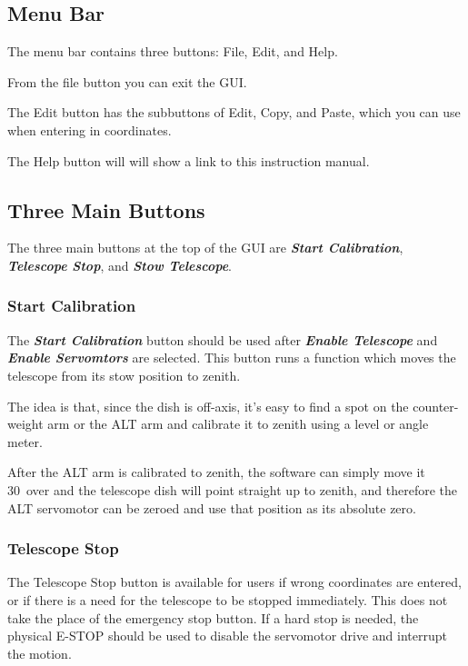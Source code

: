 \documentclass{article}
\begin{document}
\subsection{Menu Bar}

The menu bar contains three buttons: File, Edit, and Help.

From the file button you can exit the GUI.

The Edit button has the subbuttons of Edit, Copy, and Paste, which you can use when entering in coordinates.

The Help button will will show a link to this instruction manual.

\subsection{Three Main Buttons}

The three main buttons at the top of the GUI are \textbf{\textit{Start Calibration}}, \textbf{\textit{Telescope Stop}}, and \textbf{\textit{Stow Telescope}}.

\subsubsection{Start Calibration}

The \textbf{\textit{Start Calibration}} button should be used after \textbf{\textit{Enable Telescope}} and \textbf{\textit{Enable Servomtors}} are selected. This button runs a function which moves the telescope from its stow position to zenith.

The idea is that, since the dish is off-axis, it's easy to find a spot on the counter-weight arm or the ALT arm and calibrate it to zenith using a level or angle meter.

After the ALT arm is calibrated to zenith, the software can simply move it 30\textdegree\ over and the telescope dish will point straight up to zenith, and therefore the ALT servomotor can be zeroed and use that position as its absolute zero.

\subsubsection{Telescope Stop}

The Telescope Stop button is available for users if wrong coordinates are entered, or if there is a need for the telescope to be stopped immediately. This does not take the place of the emergency stop button. If a hard stop is needed, the physical E-STOP should be used to disable the servomotor drive and interrupt the motion.
\end{document}

